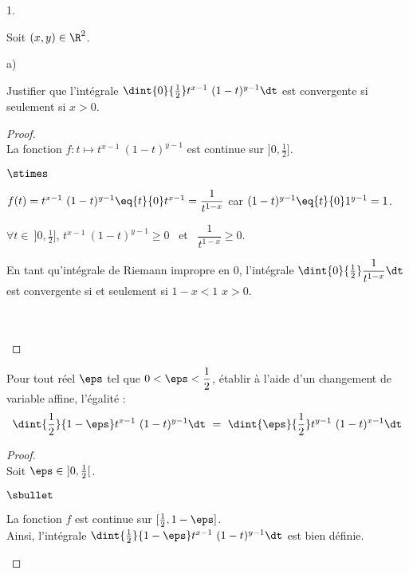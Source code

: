 \documentclass[11pt]{article}%
\begin{document}
\begin{noliste}{1.}
  \setlength{\itemsep}{4mm} %
  \setcounter{enumi}{3}
\item Soit $(x,y) \in \R^2$.
  \begin{noliste}{a)}
    \setlength{\itemsep}{2mm}
  \item Justifier que l'intégrale $\dint{0}{\frac{1}{2}} t^{x-1} \
    (1-t)^{y-1} \dt$ est convergente si seulement si $x>0$.

    \begin{proof}~\\%
      La fonction $f : t \mapsto t^{x-1} \ (1-t)^{y-1}$ est continue
      sur $]0, \frac{1}{2}]$.
      \begin{noliste}{$\stimes$}
      \item $f(t) = t^{x-1} \ (1-t)^{y-1} \eq{t}{0} t^{x-1} =
        \dfrac{1}{t^{1-x}}$ \quad car \quad $(1-t)^{y-1} \eq{t}{0}
        1^{y-1} = 1$.
        
      \item $\forall t \in \ ]0, \frac{1}{2}]$, $t^{x-1} \ (1-t)^{y-1}
        \geq 0$ \ et \ $\dfrac{1}{t^{1-x}} \geq 0$.
        
      \item En tant qu'intégrale de Riemann impropre en $0$,
        l'intégrale $\dint{0}{\frac{1}{2}} \dfrac{1}{t^{1-x}} \dt$ est
        convergente si et seulement si $1 - x < 1$ \ie $x > 0$. 
      \end{noliste}~\\[-1.4cm]
      ~\\[-1cm]
    \end{proof}
    
  \item Pour tout réel $\eps$ tel que $0 < \eps < \dfrac{1}{2}$,
    établir à l'aide d'un changement de variable affine, l'égalité :
    \[
    \dint{\frac{1}{2}}{1-\eps} t^{x-1} \ (1-t)^{y-1} \dt \ = \
    \dint{\eps}{\frac{1}{2}} t^{y-1} \ (1-t)^{x-1} \dt
    \]

    \begin{proof}~\\%
      Soit $\eps \in \ ]0, \frac{1}{2}[$.
      \begin{noliste}{$\sbullet$}
      \item La fonction $f$ est continue sur $[\frac{1}{2}, 1 -
        \eps]$.\\
        Ainsi, l'intégrale $\dint{\frac{1}{2}}{1-\eps} t^{x-1} \
        (1-t)^{y-1} \dt$ est bien définie.


\end{noliste}
\end{proof}
\end{noliste}
\end{noliste}
\end{document}
